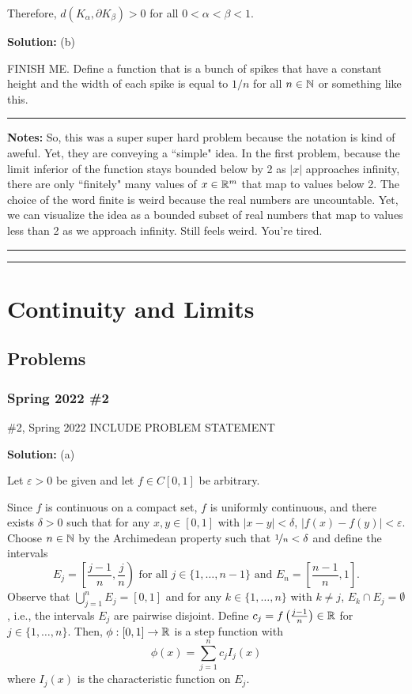 \documentclass{article}
\begin{document}
Therefore, $d(K_\alpha,\partial K_\beta) > 0$ for all $0 < \alpha < \beta < 1$. 


\textbf{Solution:} (b)

FINISH ME. Define a function that is a bunch of spikes that have a constant height and the width of each spike is equal to $1/n$ for all $n\in \mathbb N$ or something like this.\\

\hrule

\textbf{Notes:} So, this was a super super hard problem because the notation is kind of aweful. Yet, they are conveying a ``simple" idea. In the first problem, because the limit inferior of the function stays bounded below by 2 as $|x|$ approaches infinity, there are only ``finitely" many values of $x\in \mathbb R^m$ that map to values below 2. The choice of the word finite is weird because the real numbers are uncountable. Yet, we can visualize the idea as a bounded subset of real numbers that map to values less than 2 as we approach infinity. Still feels weird. You're tired.\\

\hrule \vspace{2pt}
\hrule

\break


\section{Continuity and Limits}

\subsection{Problems}

\subsubsection{Spring 2022 \#2}

\begin{problem}{\#2, Spring 2022} INCLUDE PROBLEM STATEMENT
\end{problem}


\textbf{Solution:} (a) 

Let $\varepsilon > 0$ be given and let $f\in C[0,1]$ be arbitrary. 

Since $f$ is continuous on a compact set, $f$ is uniformly continuous, and there exists $\delta > 0 $ such that for any $x,y\in [0,1]$ with $|x -y| < \delta$, $|f(x) - f(y)| < \varepsilon$. Choose $n\in \mathbb N$ by the Archimedean property such that $\nicefrac{1}{n} <\delta$ and define the intervals 
	\[ E_j = \left[\frac{j-1}{n}, \frac{j}{n}\right) \text{ for all } j\in \{1, \dots, n-1\} \text{ and } E_n = \left[ \frac{n-1}{n}, 1 \right].\]
Observe that $\bigcup_{j=1}^n E_j = [0,1]$ and for any $k\in \{1, \dots, n\}$ with $k\neq j$, $E_k \cap E_j = \emptyset$, i.e., the intervals $E_j$ are pairwise disjoint. Define $c_j = f\left(\frac{j-1}{n}\right)\in\mathbb R$ for $j \in \{1, \dots, n\}$. Then, $\phi:[0,1] \to \mathbb R$ is a step function with
	\[ \phi(x) = \sum_{j=1}^n c_j I_j(x)\]
where $I_j(x)$ is the characteristic function on $E_j$. 
\end{document}
